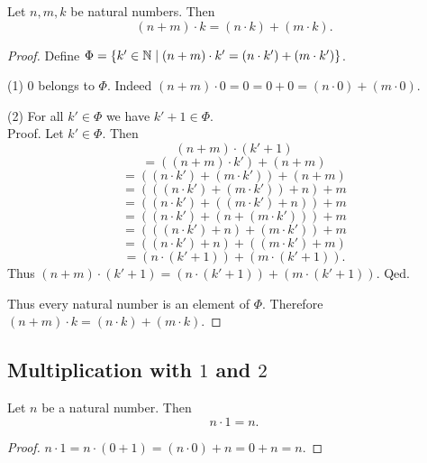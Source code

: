 \documentclass[10pt]{article}
\begin{document}
  \begin{forthel}
    \begin{proposition}
      Let $n, m, k$ be natural numbers.
      Then \[ (n + m) \cdot k = (n \cdot k) + (m \cdot k). \]
    \end{proposition}
    \begin{proof}
      Define $\Phi = \{ k' \in \mathbb{N} \mid (n + m) \cdot k' =
      (n \cdot k') + (m \cdot k') \}$.

      (1) $0$ belongs to $\Phi$.
      Indeed $(n + m) \cdot 0
        = 0
        = 0 + 0
        = (n \cdot 0) + (m \cdot 0)$.

      (2) For all $k' \in \Phi$ we have $k' + 1 \in \Phi$. \\
      Proof.
        Let $k' \in \Phi$.
        Then
        \[  (n + m) \cdot (k' + 1)                        \]
        \[    = ((n + m) \cdot k') + (n + m)              \]
        \[    = ((n \cdot k') + (m \cdot k')) + (n + m)   \]
        \[    = (((n \cdot k') + (m \cdot k')) + n) + m   \]
        \[    = ((n \cdot k') + ((m \cdot k') + n)) + m   \]
        \[    = ((n \cdot k') + (n + (m \cdot k'))) + m   \]
        \[    = (((n \cdot k') + n) + (m \cdot k')) + m   \]
        \[    = ((n \cdot k') + n) + ((m \cdot k') + m)   \]
        \[    = (n \cdot (k' + 1)) + (m \cdot (k' + 1)).  \]
        Thus $(n + m) \cdot (k' + 1) = (n \cdot (k' + 1)) + (m \cdot (k' + 1))$.
      Qed.

      Thus every natural number is an element of $\Phi$.
      Therefore $(n + m) \cdot k = (n \cdot k) + (m \cdot k)$.
    \end{proof}
  \end{forthel}


  \subsection{Multiplication with $1$ and $2$}

  \begin{forthel}
    \begin{proposition}
      Let $n$ be a natural number.
      Then \[ n \cdot 1 = n. \]
    \end{proposition}
    \begin{proof}
      $n \cdot 1
        = n \cdot (0 + 1)
        = (n \cdot 0) + n
        = 0 + n
        = n$.
    \end{proof}
  \end{forthel}
\end{document}
